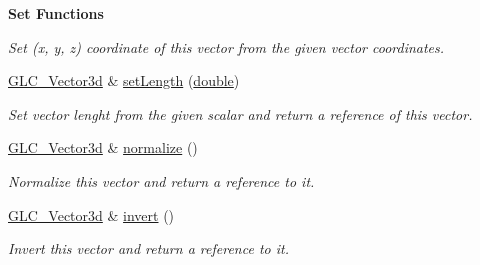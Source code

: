 \begin{Indent}{\bf Set Functions}
\begin{DoxyCompactItemize}
\begin{DoxyCompactList}\small\item\em Set (x, y, z) coordinate of this vector from the given vector coordinates. \end{DoxyCompactList}\item 
\hyperlink{class_g_l_c___vector3d}{G\-L\-C\-\_\-\-Vector3d} \& \hyperlink{class_g_l_c___vector3d_a4b8c33e9f02f9d19cf58116b293e88c3}{set\-Length} (\hyperlink{_super_l_u_support_8h_a8956b2b9f49bf918deed98379d159ca7}{double})
\begin{DoxyCompactList}\small\item\em Set vector lenght from the given scalar and return a reference of this vector. \end{DoxyCompactList}\item 
\hyperlink{class_g_l_c___vector3d}{G\-L\-C\-\_\-\-Vector3d} \& \hyperlink{class_g_l_c___vector3d_abd20733e043855257adbeed246af1596}{normalize} ()
\begin{DoxyCompactList}\small\item\em Normalize this vector and return a reference to it. \end{DoxyCompactList}\item 
\hyperlink{class_g_l_c___vector3d}{G\-L\-C\-\_\-\-Vector3d} \& \hyperlink{class_g_l_c___vector3d_a1c0574b5b664f42b0b85e46c7922d96c}{invert} ()
\begin{DoxyCompactList}\small\item\em Invert this vector and return a reference to it. \end{DoxyCompactList}\end{DoxyCompactItemize}
\end{Indent}
